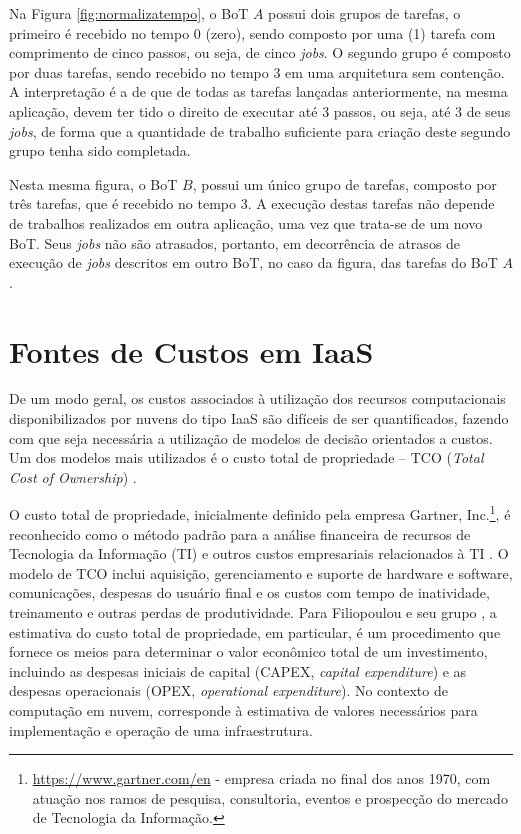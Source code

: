 \documentclass[tese,capa]{texufpel}
\begin{document}
Na Figura \ref{fig:normalizatempo}, o BoT $A$ possui dois grupos de tarefas, o primeiro é recebido no tempo 0 (zero), sendo composto por uma (1) tarefa com comprimento de cinco passos, ou seja, de cinco \textit{jobs}. O segundo grupo é composto por duas tarefas, sendo recebido no tempo 3 em uma arquitetura sem contenção. A interpretação é a de que de todas as tarefas lançadas anteriormente, na mesma aplicação, devem ter tido o direito de executar até 3 passos, ou seja, até 3 de seus \textit{jobs}, de forma que a quantidade de trabalho suficiente para criação deste segundo grupo tenha sido completada.

Nesta mesma figura, o BoT $B$, possui um único grupo de tarefas, composto por três tarefas, que é recebido no tempo 3. A execução destas tarefas não depende de trabalhos realizados em outra aplicação, uma vez que trata-se de um novo BoT. Seus \textit{jobs} não são atrasados, portanto, em decorrência de atrasos de execução de \textit{jobs} descritos em outro BoT, no caso da figura, das tarefas do BoT $A$. 

\section{Fontes de Custos em IaaS}\label{sec:fontescustos}
De um modo geral, os custos associados à utilização dos recursos computacionais disponibilizados por nuvens do tipo IaaS são difíceis de ser quantificados, fazendo com que seja necessária a utilização de modelos de decisão orientados a custos. Um dos modelos mais utilizados é o custo total de propriedade -- TCO (\emph{Total Cost of Ownership}) \cite{strebelEconomicDecisionModel2010}.

O custo total de propriedade, inicialmente definido pela empresa Gartner, Inc.\footnote{\url{https://www.gartner.com/en} - empresa criada no final dos anos 1970, com atuação nos ramos de pesquisa, consultoria, eventos e prospecção do mercado de Tecnologia da Informação.}, é reconhecido como o método padrão para a análise financeira de recursos de Tecnologia da Informação (TI) e outros custos empresariais relacionados à TI \cite{mieritzDefiningGartnerTotal2005}. O modelo de TCO inclui aquisição, gerenciamento e suporte de hardware e software, comunicações, despesas do usuário final e os custos com tempo de inatividade, treinamento e outras perdas de produtividade. Para Filiopoulou e seu grupo \cite{filiopoulouIntegratingCostAnalysis2015}, a estimativa do custo total de propriedade, em particular, é um procedimento que fornece os meios para determinar o valor econômico total de um investimento, incluindo as despesas iniciais de capital (CAPEX, \emph{capital expenditure}) e as despesas operacionais (OPEX, \emph{operational expenditure}). No contexto de computação em nuvem, corresponde à estimativa de valores necessários para implementação e operação de uma infraestrutura.
\end{document}
